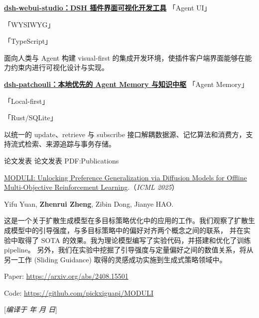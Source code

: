 \documentclass[letterpaper,MMMyyyy,nonstopmode]{simpleresumecv}
\renewcommand{\UseNoteFont}{\normalfont\fontsize{8.3pt}{10pt}\selectfont}
\renewcommand{\BigGap}{\par\vspace{2.8mm}\par}
\newcommand{\CVNote}{编译于 {\number\year} 年 {\number\month} 月 {\number\day} 日}
\newcommand{\ProjectTag}[1]{%
  \nobreak\hspace{0.35em}%
  {\normalfont\CVHeadingCJK
   \fontsize{7.8pt}{9.4pt}\selectfont
   \color{black!58}「#1」}%
}
\begin{document}
\begin{Body}
\BigGap
\Entry
\href{https://github.com/memorax-ai/dsh-webui-studio}{\textbf{dsh-webui-studio：DSH 插件界面可视化开发工具}}
\ProjectTag{Agent UI}
\ProjectTag{WYSIWYG}
\ProjectTag{TypeScript}
\newline
面向人类与 Agent 构建 visual-first 的集成开发环境，使插件客户端界面能够在能力约束内进行可视化设计与实现。

\BigGap
\Entry
\href{https://github.com/memorax-ai/dsh-patchouli}{\textbf{dsh-patchouli：本地优先的 Agent Memory 与知识中枢}}
\ProjectTag{Agent Memory}
\ProjectTag{Local-first}
\ProjectTag{Rust/SQLite}
\newline
以统一的 update、retrieve 与 subscribe 接口解耦数据源、记忆算法和消费方，支持流式检索、来源追踪与事务存储。



\Section
{论文发表}
{论文发表}
{PDF:Publications}

\Entry
\href{https://arxiv.org/abs/2408.15501}{MODULI: Unlocking Preference Generalization via Diffusion Models for Offline Multi-Objective Reinforcement Learning}.（\textit{ICML 2025}）

Yifu Yuan, \textbf{Zhenrui Zheng}, Zibin Dong, Jianye HAO.

这是一个关于扩散生成模型在多目标策略优化中的应用的工作。我们观察了扩散生成模型中的引导强度，与多目标策略中的偏好对齐两个概念之间的联系，
并在实验中取得了 SOTA 的效果。我为理论模型编写了实验代码，并搭建和优化了训练 pipeline。
另外，我们在实验中挖掘了引导强度与定量偏好之间的数值关系，将从另一工作 (Sliding Guidance) 取得的灵感成功实施到生成式策略领域中。

Paper: \url{https://arxiv.org/abs/2408.15501}

Code: \url{https://github.com/pickxiguapi/MODULI}

\end{Body}

\BigGap
\UseNoteFont%
\null\hfill%
[\textit{\CVNote}]
\end{document}
